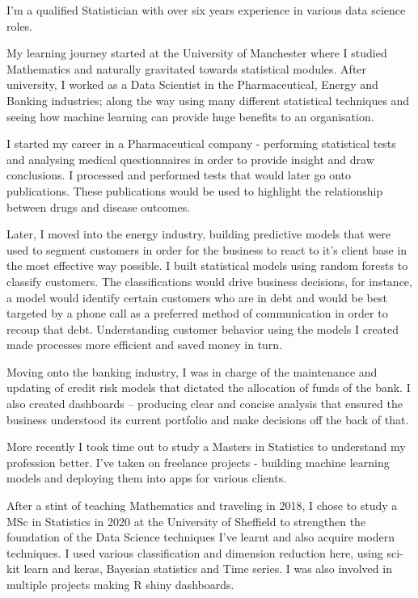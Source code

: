 \documentclass[11pt, a4paper]{awesome-cv}
\begin{document}
I'm a qualified Statistician with over six years experience in various
data science roles.

My learning journey started at the University of Manchester where I
studied Mathematics and naturally gravitated towards statistical
modules. After university, I worked as a Data Scientist in the
Pharmaceutical, Energy and Banking industries; along the way using many
different statistical techniques and seeing how machine learning can
provide huge benefits to an organisation.

I started my career in a Pharmaceutical company - performing statistical
tests and analysing medical questionnaires in order to provide insight
and draw conclusions. I processed and performed tests that would later
go onto publications. These publications would be used to highlight the
relationship between drugs and disease outcomes.

Later, I moved into the energy industry, building predictive models that
were used to segment customers in order for the business to react to
it's client base in the most effective way possible. I built statistical
models using random forests to classify customers. The classifications
would drive business decisions, for instance, a model would identify
certain customers who are in debt and would be best targeted by a phone
call as a preferred method of communication in order to recoup that
debt. Understanding customer behavior using the models I created made
processes more efficient and saved money in turn.

Moving onto the banking industry, I was in charge of the maintenance and
updating of credit risk models that dictated the allocation of funds of
the bank. I also created dashboards -- producing clear and concise
analysis that ensured the business understood its current portfolio and
make decisions off the back of that.

More recently I took time out to study a Masters in Statistics to
understand my profession better. I've taken on freelance projects -
building machine learning models and deploying them into apps for
various clients.

After a stint of teaching Mathematics and traveling in 2018, I chose to
study a MSc in Statistics in 2020 at the University of Sheffield to
strengthen the foundation of the Data Science techniques I've learnt and
also acquire modern techniques. I used various classification and
dimension reduction here, using sci-kit learn and keras, Bayesian
statistics and Time series. I was also involved in multiple projects
making R shiny dashboards.
\end{document}

